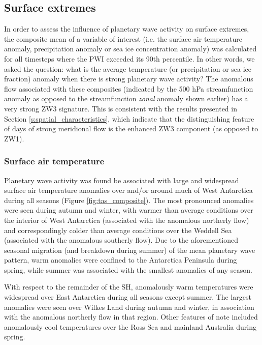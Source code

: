 \subsection{Surface extremes}\label{s:surface_extremes}

In order to assess the influence of planetary wave activity on surface extremes, the composite mean of a variable of interest (i.e. the surface air temperature anomaly, precipitation anomaly or sea ice concentration anomaly) was calculated for all timesteps where the PWI exceeded its 90th percentile. In other words, we asked the question: what is the average temperature (or precipitation or sea ice fraction) anomaly when there is strong planetary wave activity? The anomalous flow associated with these composites (indicated by the 500 hPa streamfunction anomaly as opposed to the streamfunction \textit{zonal} anomaly shown earlier) has a very strong ZW3 signature. This is consistent with the results presented in Section \ref{s:spatial_characteristics}, which indicate that the distinguishing feature of days of strong meridional flow is the enhanced ZW3 component (as opposed to ZW1).  

\subsubsection{Surface air temperature}

Planetary wave activity was found be associated with large and widespread surface air temperature anomalies over and/or around much of West Antarctica during all seasons (Figure \ref{fig:tas_composite}). The most pronounced anomalies were seen during autumn and winter, with warmer than average conditions over the interior of West Antarctica (associated with the anomalous northerly flow) and correspondingly colder than average conditions over the Weddell Sea (associated with the anomalous southerly flow). Due to the aforementioned seasonal migration (and breakdown during summer) of the mean planetary wave pattern, warm anomalies were confined to the Antarctica Peninsula during spring, while summer was associated with the smallest anomalies of any season.  

With respect to the remainder of the SH, anomalously warm temperatures were widespread over East Antarctica during all seasons except summer. The largest anomalies were seen over Wilkes Land during autumn and winter, in association with the anomalous northerly flow in that region. Other features of note included anomalously cool temperatures over the Ross Sea and mainland Australia during spring.
